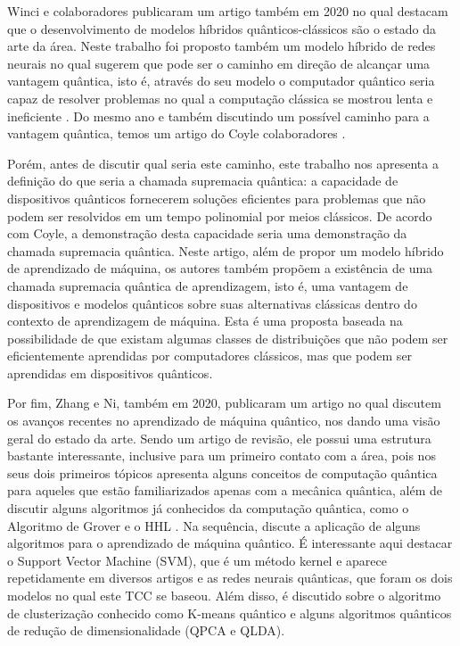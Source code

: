 Winci e colaboradores publicaram um artigo também em 2020 no qual destacam que o desenvolvimento de modelos híbridos quânticos-clássicos são o estado da arte da área. Neste trabalho foi proposto também um modelo híbrido de redes neurais no qual sugerem que pode ser o caminho em direção de alcançar uma vantagem quântica, isto é, através do seu modelo o computador quântico seria capaz de resolver problemas no qual a computação clássica se mostrou lenta e ineficiente \cite{Winci_2020}. Do mesmo ano e também discutindo um possível caminho para a vantagem quântica, temos um artigo do Coyle colaboradores \cite{vantagem}.

Porém, antes de discutir qual seria este caminho, este trabalho nos apresenta a definição do que seria a chamada supremacia quântica: a capacidade de dispositivos quânticos fornecerem soluções eficientes para problemas que não podem ser resolvidos em um tempo polinomial por meios clássicos. De acordo com Coyle, a demonstração desta capacidade  seria uma demonstração da chamada supremacia quântica. Neste artigo, além de propor um modelo híbrido de aprendizado de máquina, os autores também propõem a existência de uma chamada supremacia quântica de aprendizagem, isto é, uma vantagem de dispositivos e modelos quânticos sobre suas alternativas clássicas dentro do contexto de aprendizagem de máquina. Esta é uma proposta baseada na possibilidade de que existam algumas classes de distribuições que não podem ser eficientemente aprendidas por computadores clássicos, mas que podem ser aprendidas em dispositivos quânticos.

Por fim, Zhang e Ni, também em 2020, publicaram um artigo no qual discutem os avanços recentes no aprendizado de máquina quântico, nos dando uma visão geral do estado da arte. Sendo um artigo de revisão, ele possui uma estrutura bastante interessante, inclusive para um primeiro contato com a área, pois nos seus dois primeiros tópicos apresenta alguns conceitos de computação quântica para aqueles que estão familiarizados apenas com a mecânica quântica, além de discutir alguns algoritmos já conhecidos da computação quântica, como o Algoritmo de Grover e o HHL \cite{ultimo}. Na sequência,  discute a aplicação de alguns algoritmos para o aprendizado de máquina quântico. É interessante aqui destacar o Support Vector Machine (SVM), que é um método kernel e aparece repetidamente em diversos artigos e as redes neurais quânticas, que foram os dois modelos no qual este TCC se baseou. Além disso, é discutido  sobre o algoritmo de clusterização conhecido como K-means quântico e alguns algoritmos quânticos de redução de dimensionalidade (QPCA e QLDA).

